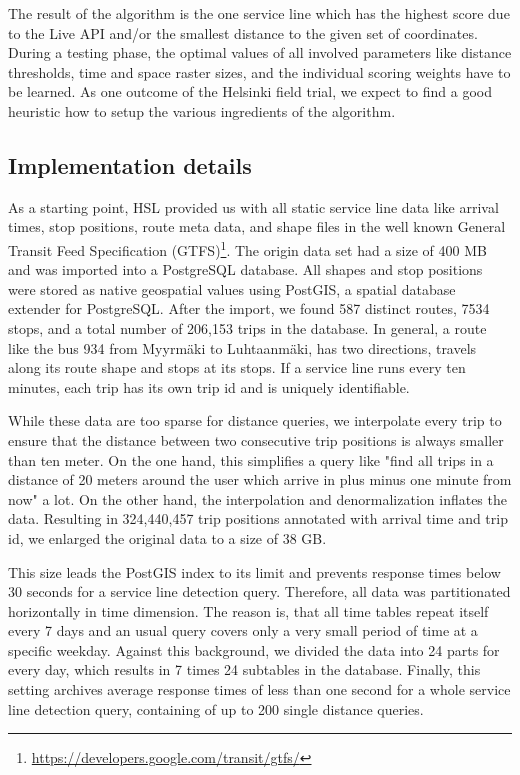 \documentclass[external]{20120615_deliverable_template_ukob}
\theoremstyle{definition}
\begin{document}
The result of the algorithm is the one service line which has the highest score due to the Live API and/or the smallest distance to the given set of coordinates. During a testing phase, the optimal values of all involved parameters like distance thresholds, time and space raster sizes, and the individual scoring weights have to be learned. As one outcome of the Helsinki field trial, we expect to find a good heuristic how to setup the various ingredients of the algorithm.

\subsection{Implementation details}
As a starting point, HSL provided us with all static service line data like arrival times, stop positions, route meta data, and shape files in the well known General Transit Feed Specification (GTFS)\footnote{\url{https://developers.google.com/transit/gtfs/}}. The origin data set had a size of 400 MB and was imported into a PostgreSQL database. All shapes and stop positions were stored as native geospatial values using PostGIS, a spatial database extender for PostgreSQL. After the import, we found 587 distinct routes, 7534 stops, and a total number of 206,153 trips in the database. In general, a route like the bus 934 from Myyrm\"{a}ki to Luhtaanm\"{a}ki, has two directions, travels along its route shape and stops at its stops. If a service line runs every ten minutes, each trip has its own trip id and is uniquely identifiable.

While these data are too sparse for distance queries, we interpolate every trip to ensure that the distance between two consecutive trip positions is always smaller than ten meter. On the one hand, this simplifies a query like "find all trips in a distance of 20 meters around the user which arrive in plus minus one minute from now" a lot. On the other hand, the interpolation and denormalization inflates the data. Resulting in 324,440,457 trip positions annotated with arrival time and trip id, we enlarged the original data to a size of 38 GB.

This size leads the PostGIS index to its limit and prevents response times below 30 seconds for a service line detection query. Therefore, all data was partitionated horizontally in time dimension. The reason is, that all time tables repeat itself every 7 days and an usual query covers only a very small period of time at a specific weekday. Against this background, we divided the data into 24 parts for every day, which results in 7 times 24 subtables in the database. Finally, this setting archives average response times of less than one second for a whole service line detection query, containing of up to 200 single distance queries.
\end{document}
